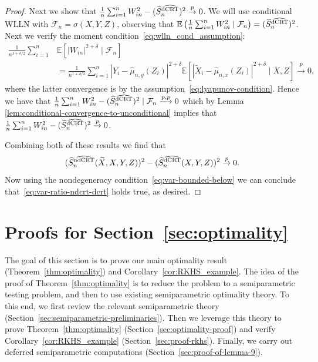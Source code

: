 \documentclass[12pt]{article}
\theoremstyle{definition}
\theoremstyle{remark}
\newcommand{\E}{\mathbb E}								%
\newcommand{\convp}{\overset p \rightarrow}             %
\newcommand{\srx}{X}									%
\newcommand{\srz}{Z}									%
\newcommand{\srxk}{\widetilde X}						%
\newcommand{\sry}{Y}									%
\newcommand{\dCRThat}{\widehat{\textnormal{dCRT}}}		%
\newcommand{\ndCRThat}{\widehat{\textnormal{ndCRT}}}	%
\newcommand{\convpp}{\overset {p,p} \longrightarrow}    %
\begin{document}
\begin{proof}
Next we show that $\frac{1}{n} \sum_{i=1}^n W^2_{in} - (\widehat S_{n}^{\dCRThat})^2 \convp 0$. We will use conditional WLLN with $\mathcal{F}_n = \sigma(\srx,\sry,\srz)$, observing that $\E\left(\frac{1}{n} \sum_{i=1}^n W^2_{in} \mid \mathcal{F}_n\right) = (\widehat S_{n}^{\dCRThat})^2 $. Next we verify the moment condition~\eqref{eq:wlln_cond_assumption}:
\begin{align}
	\frac{1}{n^{1+\delta/2}} \sum_{i = 1}^n &\E[|W_{in}|^{2+\delta} \mid \mathcal{F}_n] \\&= \frac{1}{n^{1+\delta/2}} \sum_{i=1}^n |\sry_i-\widehat\mu_{n,y}(\srz_i)|^{2+\delta}\E\left[|\srxk_i-\widehat\mu_{n,x}(\srz_i)|^{2+\delta}\mid \srx,\srz\right] \convp 0,
\end{align} 
where the latter convergence is by the assumption~\eqref{eq:lyapunov-condition}.
Hence we have that $\frac{1}{n} \sum_{i = 1}^n W^2_{in} - (\widehat S_{n}^{\dCRThat})^2  \mid \mathcal F_n \convpp 0$ which by Lemma \ref{lem:conditional-convergence-to-unconditional} implies that $\frac{1}{n} \sum_{i=1}^n W^2_{in} - (\widehat S_{n}^{\dCRThat})^2 \convp 0$.

Combining both of these results we find that 
\begin{equation*}
(\widehat S_{n}^{\ndCRThat}(\srxk, \srx, \sry, \srz))^2 - (\widehat S_{n}^{\dCRThat}(\srx, \sry, \srz))^2 \convp 0. 
\end{equation*}
Now using the nondegeneracy condition~\eqref{eq:var-bounded-below} we can conclude that~\eqref{eq:var-ratio-ndcrt-dcrt} holds true, as desired.
\end{proof}

\section{Proofs for Section~\ref{sec:optimality}} \label{sec:optimality-proofs}

The goal of this section is to prove our main optimality result (Theorem~\ref{thm:optimality}) and Corollary~\ref{cor:RKHS_example}. The idea of the proof of Theorem~\ref{thm:optimality} is to reduce the problem to a semiparametric testing problem, and then to use existing semiparametric optimality theory. To this end, we first review the relevant semiparametric theory (Section~\ref{sec:semiparametric-preliminaries}). Then we leverage this theory to prove Theorem~\ref{thm:optimality} (Section~\ref{sec:optimality-proof}) and verify Corollary~\ref{cor:RKHS_example} (Section~\ref{sec:proof-rkhs}). Finally, we carry out deferred semiparametric computations (Section~\ref{sec:proof-of-lemma-9}).
\end{document}

